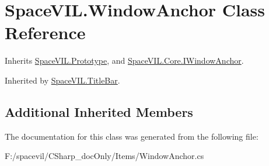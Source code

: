 \hypertarget{class_space_v_i_l_1_1_window_anchor}{}\section{Space\+V\+I\+L.\+Window\+Anchor Class Reference}
\label{class_space_v_i_l_1_1_window_anchor}


Inherits \mbox{\hyperlink{class_space_v_i_l_1_1_prototype}{Space\+V\+I\+L.\+Prototype}}, and \mbox{\hyperlink{interface_space_v_i_l_1_1_core_1_1_i_window_anchor}{Space\+V\+I\+L.\+Core.\+I\+Window\+Anchor}}.



Inherited by \mbox{\hyperlink{class_space_v_i_l_1_1_title_bar}{Space\+V\+I\+L.\+Title\+Bar}}.

\subsection*{Additional Inherited Members}


The documentation for this class was generated from the following file\+:\begin{DoxyCompactItemize}
\item 
F\+:/spacevil/\+C\+Sharp\+\_\+doc\+Only/\+Items/Window\+Anchor.\+cs\end{DoxyCompactItemize}

